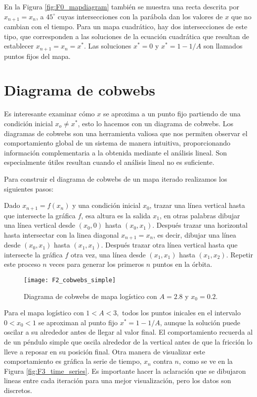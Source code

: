        En la Figura \ref{fig:F0_mapdiagram} también se muestra una recta descrita por $x_{n+1} = x_{n}$, a $45^{\circ}$ cuyas intersecciones con la parábola dan los valores de $x$ que no cambian con el tiempo. Para un mapa cuadrático, hay dos intersecciones de este tipo, que corresponden a las soluciones de la ecuación cuadrática que resultan de establecer $x_{n+1} = x_{n} = x^{*}$. Las soluciones $x^{*} = 0$ y $x^{*} = 1 - 1/A$ son llamados puntos fijos del mapa.

    \section{Diagrama de cobwebs}

        Es interesante examinar cómo $x$ se aproxima a un punto fijo partiendo de una condición inicial $x_{o} \neq x^{*}$, esto lo hacemos con un diagrama de cobwebs. Los diagramas de cobwebs son una herramienta valiosa que nos permiten observar el comportamiento global de un sistema de manera intuitiva, proporcionando información complementaria a la obtenida mediante el análisis lineal. Son especialmente útiles resultan cuando el análisis lineal no es suficiente.

        Para construir el diagrama de cobwebs de un mapa iterado realizamos los siguientes pasos:

        Dado $x_{n+1} = f(x_{n})$ y una condición inicial $x_{0}$, trazar una línea vertical hasta que intersecte la gráfica $f$, esa altura es la salida $x_{1}$, en otras palabras dibujar una línea vertical desde $(x_{0}, 0) $ hasta $(x_{0}, x_{1})$. Después trazar una horizontal hasta intersectar con la linea diagonal $x_{n+1} = x_{n}$, es decir, dibujar una línea desde  $(x_{0}, x_{1}) $ hasta $(x_{1}, x_{1})$. Después trazar otra línea vertical hasta que intersecte la gráfica $f$ otra vez, una línea desde $(x_{1}, x_{1}) $ hasta $(x_{1}, x_{2})$. Repetir este proceso $n$ veces para generar los primeros $n$ puntos en la órbita.

        \begin{figure}[hbtp]
            \caption{Diagrama de cobwebs de mapa logístico con $A = 2.8$ y $x_{0} = 0.2$.}
            \centering
            \texttt{[image: F2\_cobwebs\_simple]}
            \label{fig:F2_cobwebs_simple}
        \end{figure}

        Para el mapa logístico con $1 < A < 3,$ todos los puntos inicales en el intervalo $0 < x_{0} < 1$ se aproximan al punto fijo $x^{*} = 1 - 1/ A $, aunque la solución puede oscilar a su alrededor antes de llegar al valor final. El comportamiento recuerda al de un péndulo simple que oscila alrededor de la vertical antes de que la fricción lo lleve a reposar en su posición final. Otra manera de visualizar este comportamiento es gráfica la serie de tiempo, $x_{n}$ contra $n$, como se ve en la Figura \ref{fig:F3_time_series}. Es importante hacer la aclaración que se dibujaron lineas entre cada iteración para una mejor visualización, pero los datos son discretos. 

